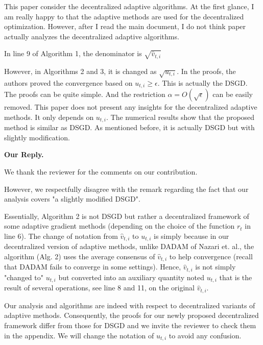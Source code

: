 \documentclass{article} %
\begin{document}
This paper consider the decentralized adaptive algorithms. At the first glance, I am really happy to that the adaptive methods are used for the decentralized optimization. However, after I read the main document, I do not think paper actually analyzes the decentralized adaptive algorithms.

In line 9 of Algorithm 1, the denominator is $\sqrt{\hat{v}_{t,i}}$

However, in Algorithms 2 and 3, it is changed as $\sqrt{u_{t,i}}$. In the proofs, the authors proved the convergence based on $u_{t,i}\geq \epsilon$. 
This is actually the DSGD. The proofs can be quite simple. 
And the restriction $\alpha=O(\sqrt{\epsilon})$ can be easily removed. This paper does not present any insights for the decentralized adaptive methods. It only depends on $u_{t,i}$. The numerical results show that the proposed method is similar as DSGD. As mentioned before, it is actually DSGD but with slightly modification.


\textbf{Our Reply.}

We thank the reviewer for the comments on our contribution.

However, we respectfully disagree with the remark regarding the fact that our analysis covers "a slightly modified DSGD".

Essentially, Algorithm 2 is not DSGD but rather a decentralized framework of some adaptive gradient methods (depending on the choice of the function $r_t$ in line 6).
The change of notation from $\hat{v}_{t,i}$ to $u_{t,i}$ is simply because in our decentralized version of adaptive methods, unlike DADAM of Nazari et. al., the algorithm (Alg. 2) uses the average consensus of $\hat v_{t,i}$ to help convergence (recall that DADAM fails to converge in some settings).
Hence, $\hat{v}_{t,i}$ is not simply "changed to" $u_{t,i}$ but converted into an auxiliary quantity noted $u_{t,i}$ that is the result of several operations, see line 8 and 11, on the original $\hat{v}_{t,i}$.

Our analysis and algorithms are indeed with respect to decentralized variants of adaptive methods.
Consequently, the proofs for our newly proposed decentralized framework differ from those for DSGD and we invite the reviewer to check them in the appendix.
We will change the notation of $u_{t,i}$ to avoid any confusion.
\end{document}
